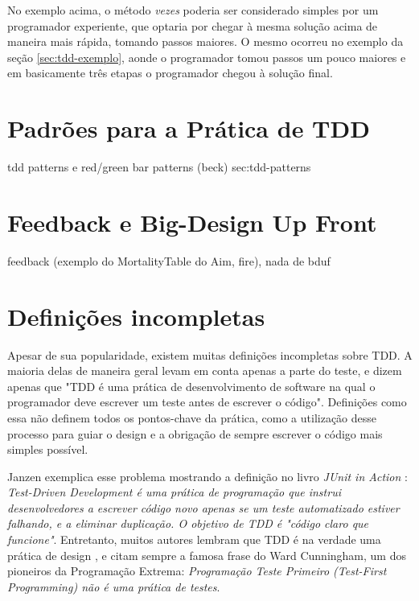 No exemplo acima, o método \textit{vezes} poderia ser considerado simples por um programador experiente, que optaria por chegar à
mesma solução acima de maneira mais rápida, tomando passos maiores. O mesmo ocorreu no exemplo da seção \ref{sec:tdd-exemplo}, aonde o
programador tomou passos um pouco maiores e em basicamente três etapas o programador chegou à solução final.

\section{Padrões para a Prática de TDD}
\label{sec:tdd-patterns}

tdd patterns e red/green bar patterns (beck) sec:tdd-patterns

\section{Feedback e Big-Design Up Front}

feedback (exemplo do MortalityTable do Aim, fire), nada de bduf

\section{Definições incompletas} 
\label{sec:tdd-definicoes-incompletas}

Apesar de sua popularidade, existem muitas definições incompletas sobre TDD. A maioria delas de maneira geral levam em conta
apenas a parte do teste, e dizem apenas
que "TDD é uma prática de desenvolvimento de software na qual o programador deve escrever um teste antes de escrever o código".
Definições como essa não definem todos os pontos-chave da prática, como a utilização desse processo para guiar o design e
a obrigação de sempre escrever o código mais simples possível.

Janzen \cite{tdd-taxonomy} exemplica esse problema mostrando a definição no livro \textit{JUnit in Action} \cite{junit-in-action}:
\textit{Test-Driven Development é uma prática de programação que instrui desenvolvedores a escrever código novo apenas se um teste
automatizado estiver falhando, e a eliminar duplicação. O objetivo de TDD é "código claro que funcione"}. 
Entretanto, muitos autores lembram que TDD é na verdade uma prática de design \cite{tdd-taxonomy} \cite{aim-fire}, 
e citam sempre a famosa frase do Ward Cunningham, um dos pioneiros da Programação Extrema:
\textit{Programação Teste Primeiro (Test-First Programming) não é uma prática de testes}. 

